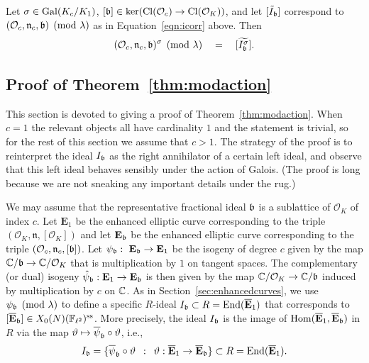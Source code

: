 \documentclass{article} \usepackage[active]{srcltx}
\newcommand{\Oc}{\mathcal{O}_c}
\newcommand{\eE}{\mathbf{E}}
\newcommand{\Felltwo}{\F_{\ell^2}}
\newcommand{\OK}{\mathcal{O}_K}
\newcommand{\n}{\mathfrak{n}}
\renewcommand{\O}{\mathcal{O}}
\DeclareMathOperator{\supersingular}{ss}
\renewcommand{\ss}{\supersingular}
\begin{document}
\begin{theorem}\label{thm:modaction} 
  Let $\sigma \in \operatorname{Gal}(K_c/K_1)$, $[\fb] \in \ker(\Cl(\Oc)\to
  \Cl(\OK))$, and let $[\tilde{I}_{\mathfrak{b}}]$ correspond to
  $(\Oc,\n_c,\fb) \pmod{\lambda}$ as in Equation~\ref{eqn:icorr}
  above.  Then
$$
   (\Oc, \n_c, \fb)^{\sigma} \pmod{\lambda} \quad = \quad
[\widetilde{I^{\sigma}_{\fb}}].
$$
\end{theorem}


\subsection{Proof of Theorem~\ref{thm:modaction}}\label{sec:proofmodact}

This section is devoted to giving a proof of
Theorem~\ref{thm:modaction}.  When $c=1$ the relevant objects all have
cardinality $1$ and the statement is trivial, so for the rest of this
section we assume that $c>1$.  The strategy of the proof is to
reinterpret the ideal $I_{\mathfrak{b}}$ as the right annihilator of a certain
left ideal, and observe that this left ideal behaves sensibly under
the action of Galois.  (The proof is long because we are not sneaking
any important details under the rug.)

We may assume that the representative fractional ideal $\mathfrak{b}$ is a
sublattice of $\O_K$ of index $c$.  Let $\eE_1$ be the enhanced
elliptic curve corresponding to the triple $(\O_K, \n, [\O_K])$ and
let $\eE_{\fb}$ be the enhanced elliptic curve corresponding to the
triple $(\O_c, \n_c, [\fb])$.  Let $\psi_\fb:\ \eE_\fb \to \eE_1$ be
the isogeny of degree $c$ given by the map $\C/\fb\to \C/\O_K$ that is
multiplication by $1$ on tangent spaces.\label{page:overc} The
complementary (or dual) isogeny $\hat{\psi}_{\fb}:\eE_1 \to \eE_\fb$
is then given by the map $\C/\O_K \to \C/\fb$ induced by
multiplication by $c$ on $\mathbb{C}$.  As in
Section~\ref{sec:enhancedcurves}, we use $\psi_{\mathfrak{b}} \pmod{\lambda}$ to
define a specific $R$-ideal $I_{\fb} \subset R
= \End(\overline{\eE}_1)$ that corresponds to $[\overline{\eE}_\fb]
\in X_0(N)(\Felltwo)^{\ss}$.  More precisely, the ideal $I_{\mathfrak{b}}$ is
the image of $\Hom(\overline{\eE}_1, \overline{\eE}_\fb)$ in $R$ via
the map $\vartheta \mapsto \overline{\psi}_{\mathfrak{b}}\circ \vartheta$,
i.e.,
$$
  I_{\fb} = \{ \overline{\psi}_{\fb}\circ \vartheta \,\,\, : \,\,\, 
         \vartheta:\overline{\eE}_1 \to \overline{\eE}_{\fb}\} \subset R=\End(\overline{\eE}_1).
$$
\end{document}
